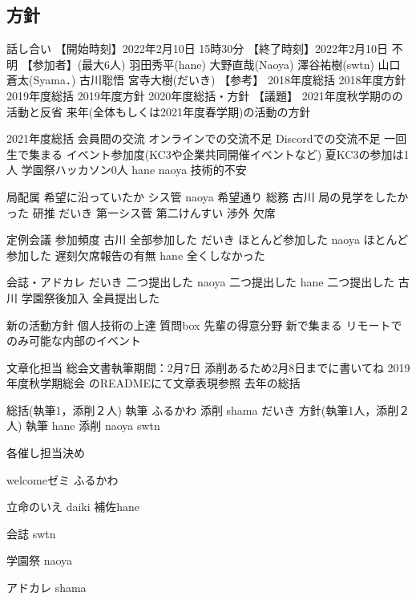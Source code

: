 \subsection*{\newGradeIfKouki{}\secondGrade{}方針}
\firstGrade{}話し合い
【開始時刻】2022年2月10日 15時30分
【終了時刻】2022年2月10日 不明
【参加者】(最大6人)
羽田秀平(hane)
大野直哉(Naoya)
澤谷祐樹(swtn)
山口蒼太(Syama．)
古川聡悟
宮寺大樹(だいき)
【参考】
2018年度総括
2018年度方針
2019年度総括
2019年度方針
2020年度総括・方針
【議題】
2021年度秋学期の\firstGrade{}の活動と反省
来年(全体もしくは2021年度春学期)の活動の方針

2021年度\firstGrade{}総括
会員間の交流 
オンラインでの交流不足
Discordでの交流不足
一回生で集まる
イベント参加度(KC3や企業共同開催イベントなど)
夏KC3の参加は1人
学園祭ハッカソン0人
hane naoya 技術的不安

局配属
希望に沿っていたか
シス管 naoya 希望通り 
総務 古川 局の見学をしたかった
研推 だいき 第一シス菅 第二けんすい
渉外 欠席

定例会議
参加頻度
古川 全部参加した
だいき ほとんど参加した
naoya ほとんど参加した
遅刻欠席報告の有無
hane 全くしなかった


会誌・アドカレ
だいき 二つ提出した
naoya 二つ提出した
hane 二つ提出した
古川 学園祭後加入
全員提出した

新\secondGrade{}の活動方針
	個人技術の上達
	質問box
	先輩の得意分野
	新\secondGrade{}で集まる
	リモートでのみ可能な内部のイベント


文章化担当
総会文書執筆期間：2月7日
添削あるため2月8日までに書いてね
2019年度秋学期総会 のREADMEにて文章表現参照
去年の\firstGrade{}総括

総括(執筆1，添削２人)
執筆
ふるかわ
添削
shama
だいき
方針(執筆1人，添削２人)
執筆
hane
添削
naoya
swtn

各催し担当決め

welcomeゼミ  ふるかわ

立命のいえ daiki 補佐hane

会誌 swtn

学園祭 naoya

アドカレ shama




